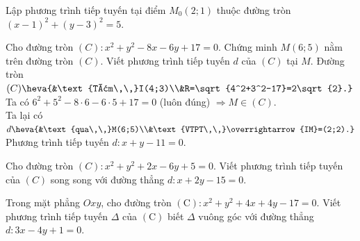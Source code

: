 \begin{bt}%
	Lập phương trình tiếp tuyến tại điểm $M_0(2;1)$ thuộc đường tròn $(x-1)^2+(y-3)^2=5$.
\end{bt}

\begin{bt}%
	Cho đường tròn $ (C)\colon x^2+y^2-8x-6y+17=0 $. Chứng minh $ M(6;5) $ nằm trên đường tròn $ (C) $. Viết phương trình tiếp tuyến $ d $ của $ (C) $ tại $ M $.
	\loigiai
	{
		Đường tròn $ (C)\heva{&\text{Tâm\,\,}I(4;3)\\&R=\sqrt{4^2+3^2-17}=2\sqrt{2}.} $\\
		Ta có $ 6^2+5^2-8\cdot 6-6\cdot 5+17=0 $ \quad(luôn đúng) $ \Rightarrow M\in (C) $.\\
		Ta lại có $ d \heva{&\text{qua\,\,}M(6;5)\\&\text{VTPT\,\,}\overrightarrow{IM}=(2;2).} $\\
		Phương trình tiếp tuyến $ d \colon x+y-11=0 $.
	}
\end{bt}

\begin{bt}%
	Cho đường tròn $(C) \colon x^2+y^2+2x-6y+5=0$. Viết phương trình tiếp tuyến của $(C)$ song song với đường thẳng
	$d:x+2y-15=0$.
\end{bt}

\begin{bt}%
	Trong mặt phẳng $Oxy$, cho đường tròn $(\mathrm{C}): x^2+y^2+4x+4y-17=0$. Viết phương trình tiếp tuyến $\Delta$ của  $(\mathrm{C})$ biết $\Delta$ vuông góc với đường thẳng $d\colon 3x-4y+1=0$.
\end{bt}

